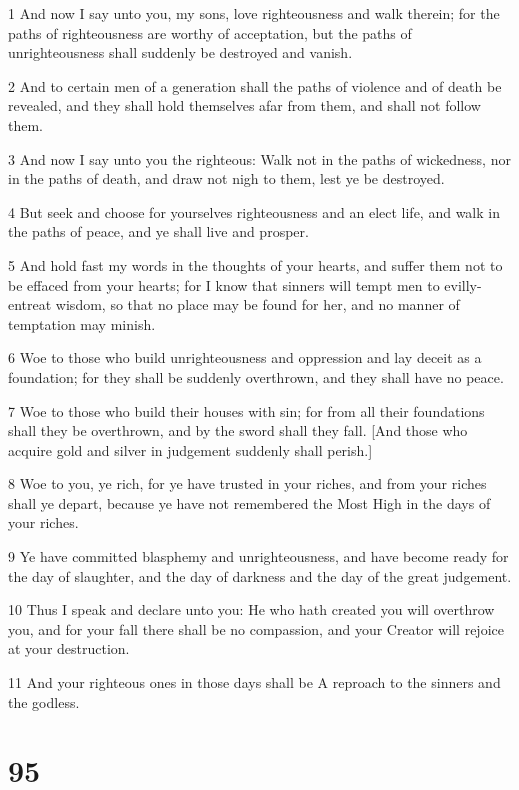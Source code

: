 \par 1 And now I say unto you, my sons, love righteousness and walk therein; for the paths of righteousness are worthy of acceptation, but the paths of unrighteousness shall suddenly be destroyed and vanish.
\par 2 And to certain men of a generation shall the paths of violence and of death be revealed, and they shall hold themselves afar from them, and shall not follow them.
\par 3 And now I say unto you the righteous: Walk not in the paths of wickedness, nor in the paths of death, and draw not nigh to them, lest ye be destroyed.
\par 4 But seek and choose for yourselves righteousness and an elect life, and walk in the paths of peace, and ye shall live and prosper.
\par 5 And hold fast my words in the thoughts of your hearts, and suffer them not to be effaced from your hearts; for I know that sinners will tempt men to evilly-entreat wisdom, so that no place may be found for her, and no manner of temptation may minish.
\par 6 Woe to those who build unrighteousness and oppression and lay deceit as a foundation; for they shall be suddenly overthrown, and they shall have no peace.
\par 7 Woe to those who build their houses with sin; for from all their foundations shall they be overthrown, and by the sword shall they fall. [And those who acquire gold and silver in judgement suddenly shall perish.]
\par 8 Woe to you, ye rich, for ye have trusted in your riches, and from your riches shall ye depart, because ye have not remembered the Most High in the days of your riches.
\par 9 Ye have committed blasphemy and unrighteousness, and have become ready for the day of slaughter, and the day of darkness and the day of the great judgement.
\par 10 Thus I speak and declare unto you: He who hath created you will overthrow you, and for your fall there shall be no compassion, and your Creator will rejoice at your destruction.
\par 11 And your righteous ones in those days shall be A reproach to the sinners and the godless.

\chapter{95}

